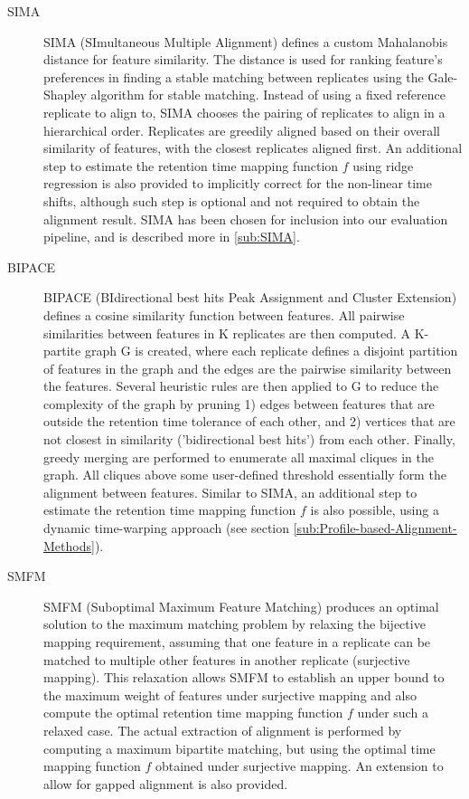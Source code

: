 \begin{description}

\item [{SIMA~\cite{Voss2011a}}] SIMA (SImultaneous Multiple Alignment) defines a custom Mahalanobis distance for feature similarity. The distance is used for ranking feature's preferences in finding a stable matching between replicates using the Gale-Shapley algorithm for stable matching. Instead of using a fixed reference replicate to align to, SIMA chooses the pairing of replicates to align in a hierarchical order. Replicates are greedily aligned based on their overall similarity of features, with the closest replicates aligned first. An additional step to estimate the retention time mapping function $f$ using ridge regression is also provided to implicitly correct for the non-linear time shifts, although such step is optional and not required to obtain the alignment result. SIMA has been chosen for inclusion into our evaluation pipeline, and is described more in \ref{sub:SIMA}.

\item [{BIPACE~\cite{Hoffmann2012a}}] BIPACE (BIdirectional best hits Peak Assignment and Cluster Extension) defines a cosine similarity function between features. All pairwise similarities between features in K replicates are then computed. A K-partite graph G is created, where each replicate defines a disjoint partition of features in the graph and the edges are the pairwise similarity between the features. Several heuristic rules are then applied to G to reduce the complexity of the graph by pruning 1) edges between features that are outside the retention time tolerance of each other, and 2) vertices that are not closest in similarity ('bidirectional best hits') from each other. Finally, greedy merging are performed to enumerate all maximal cliques in the graph. All cliques above some user-defined threshold essentially form the alignment between features. Similar to SIMA, an additional step to estimate the retention time mapping function $f$ is also possible, using a dynamic time-warping approach (see section \ref{sub:Profile-based-Alignment-Methods}).

\item [{SMFM~\cite{Lin2013}}] SMFM (Suboptimal Maximum Feature Matching) produces an optimal solution to the maximum matching problem by relaxing the bijective mapping requirement, assuming that one feature in a replicate can be matched to multiple other features in another replicate (surjective mapping). This relaxation allows SMFM to establish an upper bound to the maximum weight of features under surjective mapping and also compute the optimal retention time mapping function $f$ under such a relaxed case. The actual extraction of alignment is performed by computing a maximum bipartite matching, but using the optimal time mapping function $f$ obtained under surjective mapping. An extension to allow for gapped alignment is also provided.

\end{description}

